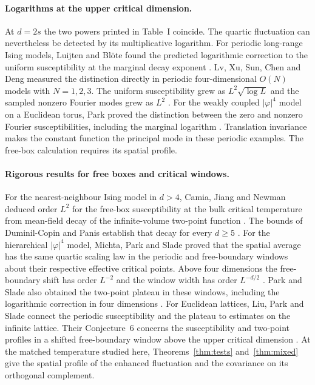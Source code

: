 \documentclass[11pt]{article}
\numberwithin{equation}{section}
\begin{document}
\paragraph{Logarithms at the upper critical dimension.}
At $d=2s$ the two powers printed in Table~I coincide. The quartic
fluctuation can nevertheless be detected by its multiplicative
logarithm. For periodic long-range Ising models, Luijten and Bl\"ote
found the predicted logarithmic correction to the uniform susceptibility
at the marginal decay exponent \cite{luijten}. Lv, Xu, Sun, Chen and
Deng measured the distinction directly in periodic four-dimensional
$O(N)$ models with $N=1,2,3$. The uniform susceptibility grew as
$L^2\sqrt{\log L}$ and the sampled nonzero Fourier modes grew as $L^2$
\cite{lv}. For the weakly coupled $|\varphi|^4$ model on a Euclidean
torus, Park proved the distinction between the zero and nonzero Fourier
susceptibilities, including the marginal logarithm
\cite[Corollary~1.10]{park-torus}. Translation invariance makes the
constant function the principal mode in these periodic examples.
The free-box calculation requires its spatial profile.

\paragraph{Rigorous results for free boxes and critical windows.}
For the nearest-neighbour Ising model in $d>4$, Camia, Jiang and
Newman deduced order $L^2$ for the free-box susceptibility at the bulk
critical temperature from mean-field decay of the infinite-volume
two-point function \cite{camia-jiang-newman}. The bounds of
Duminil-Copin and Panis establish that decay for every $d\ge5$
\cite{duminil-panis}.
For the hierarchical $|\varphi|^4$ model, Michta, Park and Slade
proved that the spatial average has the same quartic scaling law in
the periodic and free-boundary windows about their respective effective
critical points. Above four dimensions the free-boundary shift has
order $L^{-2}$ and the window width has order $L^{-d/2}$
\cite{michta-park-slade}. Park and Slade also obtained the two-point
plateau in these windows, including the logarithmic correction in four
dimensions \cite{park-slade}. For Euclidean lattices, Liu, Park and
Slade connect the periodic susceptibility and the plateau to estimates
on the infinite lattice. Their Conjecture~6 concerns the susceptibility
and two-point profiles in a shifted free-boundary window above the upper
critical dimension \cite{liu-park-slade}. At the matched temperature
studied here, Theorems~\ref{thm:tests} and~\ref{thm:mixed} give the
spatial profile of the enhanced fluctuation and the covariance on its
orthogonal complement.
\end{document}
